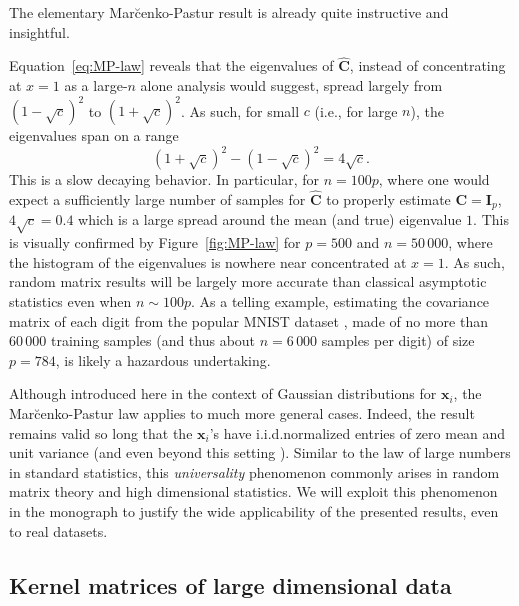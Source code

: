 \documentclass[MAL,biber]{nowfnt} %
\newcommand{\C}{{\mathbf{C}}}
\newcommand{\I}{{\mathbf{I}}}
\newcommand{\x}{{\mathbf{x}}}
\begin{document}
The elementary Mar{\u c}enko-Pastur result is already quite instructive and insightful.
\begin{remark}
Equation~\eqref{eq:MP-law} reveals that the eigenvalues of $\hat\C$, instead of concentrating at $x=1$ as a large-$n$ alone analysis would suggest, spread largely from $(1-\sqrt{c})^2$ to $(1+\sqrt{c})^2$. As such, for small $c$ (i.e., for large $n$), the eigenvalues span on a range
\begin{equation*}
    (1+\sqrt{c})^2-(1-\sqrt{c})^2 = 4\sqrt{c}.
\end{equation*}
This is a slow decaying behavior. In particular, for $n=100p$, where one would expect a sufficiently large number of samples for $\hat \C$ to properly estimate $\C=\I_p$, $4\sqrt{c}=0.4$ which is a large spread around the mean (and true) eigenvalue $1$. This is visually confirmed by Figure~\ref{fig:MP-law} for $p = 500$ and $n = 50\,000$, where the histogram of the eigenvalues is nowhere near concentrated at $x=1$. As such, random matrix results will be largely more accurate than classical asymptotic statistics even when $n\sim 100p$. As a telling example, estimating the covariance matrix of each digit from the popular MNIST dataset \citep{lecun1998gradient}, made of no more than $60\,000$ training samples (and thus about $n=6\,000$ samples per digit) of size $p=784$, is likely a hazardous undertaking.
\end{remark}


\begin{remark}[On universality]\label{rem:universality}
Although introduced here in the context of Gaussian distributions for $\x_i$, the Mar{\u c}enko-Pastur law applies to much more general cases. Indeed, the result remains valid so long that the $\x_i$'s have i.i.d.\@ normalized entries of zero mean and unit variance (and even beyond this setting \citep{el2009concentration,louart2019concentration}). Similar to the law of large numbers in standard statistics, this \emph{universality} phenomenon commonly arises in random matrix theory and high dimensional statistics. We will exploit this phenomenon in the monograph to justify the wide applicability of the presented results, even to real datasets. 
\end{remark}



\subsection{Kernel matrices of large dimensional data}
\label{sec:intro-kernel}
\end{document}
